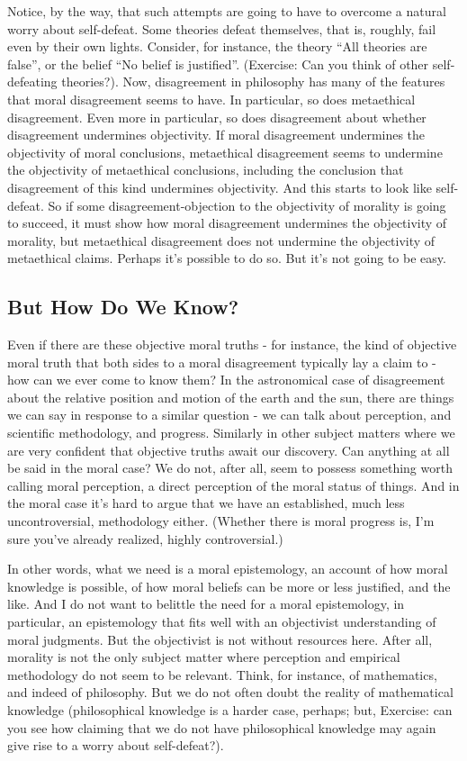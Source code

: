 Notice, by the way, that such attempts are going to have to overcome a natural 
worry about self-defeat. Some theories defeat themselves, that is, roughly, fail even by 
their own lights. Consider, for instance, the theory “All theories are false”, or the belief 
“No belief is justified”. (Exercise: Can you think of other self-defeating theories?). Now,
disagreement in philosophy has many of the features that moral disagreement seems to 
have. In particular, so does metaethical disagreement. Even more in particular, so does 
disagreement about whether disagreement undermines objectivity. If moral 
disagreement undermines the objectivity of moral conclusions, metaethical 
disagreement seems to undermine the objectivity of metaethical conclusions, including 
the conclusion that disagreement of this kind undermines objectivity. And this starts to 
look like self-defeat. So if some disagreement-objection to the objectivity of morality is 
going to succeed, it must show how moral disagreement undermines the objectivity of 
morality, but metaethical disagreement does not undermine the objectivity of 
metaethical claims. Perhaps it's possible to do so. But it's not going to be easy. 

\subsection{But How Do We Know?} 
Even if there are these objective moral truths - for instance, the kind of objective moral 
truth that both sides to a moral disagreement typically lay a claim to - how can we ever 
come to know them? In the astronomical case of disagreement about the relative 
position and motion of the earth and the sun, there are things we can say in response to 
a similar question - we can talk about perception, and scientific methodology, and 
progress. Similarly in other subject matters where we are very confident that objective 
truths await our discovery. Can anything at all be said in the moral case? We do not, 
after all, seem to possess something worth calling moral perception, a direct perception 
of the moral status of things. And in the moral case it's hard to argue that we have an
established, much less uncontroversial, methodology either. (Whether there is moral 
progress is, I'm sure you've already realized, highly controversial.) 

In other words, what we need is a moral epistemology, an account of how moral 
knowledge is possible, of how moral beliefs can be more or less justified, and the like. 
And I do not want to belittle the need for a moral epistemology, in particular, an 
epistemology that fits well with an objectivist understanding of moral judgments. But 
the objectivist is not without resources here. After all, morality is not the only subject 
matter where perception and empirical methodology do not seem to be relevant. Think, 
for instance, of mathematics, and indeed of philosophy. But we do not often doubt the 
reality of mathematical knowledge (philosophical knowledge is a harder case, perhaps; 
but, Exercise: can you see how claiming that we do not have philosophical knowledge 
may again give rise to a worry about self-defeat?). 

